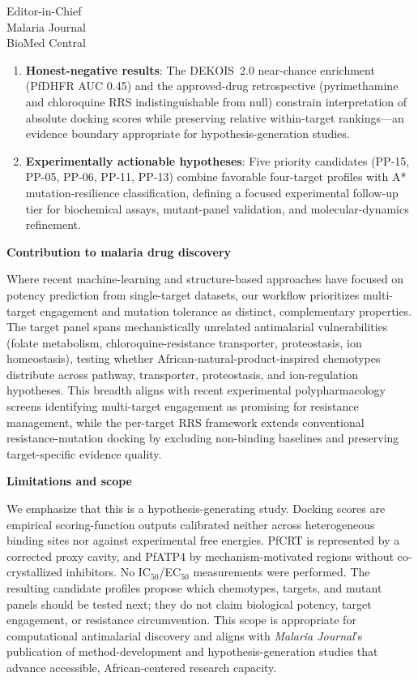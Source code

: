 \documentclass[11pt,a4paper]{letter}
\begin{document}
\begin{letter}{Editor-in-Chief\\
Malaria Journal\\
BioMed Central}
\begin{enumerate}
\item \textbf{Honest-negative results}: The DEKOIS~2.0 near-chance enrichment (PfDHFR AUC 0.45) and the approved-drug retrospective (pyrimethamine and chloroquine RRS indistinguishable from null) constrain interpretation of absolute docking scores while preserving relative within-target rankings—an evidence boundary appropriate for hypothesis-generation studies.

\item \textbf{Experimentally actionable hypotheses}: Five priority candidates (PP-15, PP-05, PP-06, PP-11, PP-13) combine favorable four-target profiles with A* mutation-resilience classification, defining a focused experimental follow-up tier for biochemical assays, mutant-panel validation, and molecular-dynamics refinement.
\end{enumerate}

\textbf{Contribution to malaria drug discovery}

Where recent machine-learning and structure-based approaches have focused on potency prediction from single-target datasets, our workflow prioritizes multi-target engagement and mutation tolerance as distinct, complementary properties. The target panel spans mechanistically unrelated antimalarial vulnerabilities (folate metabolism, chloroquine-resistance transporter, proteostasis, ion homeostasis), testing whether African-natural-product-inspired chemotypes distribute across pathway, transporter, proteostasis, and ion-regulation hypotheses. This breadth aligns with recent experimental polypharmacology screens identifying multi-target engagement as promising for resistance management, while the per-target RRS framework extends conventional resistance-mutation docking by excluding non-binding baselines and preserving target-specific evidence quality.

\textbf{Limitations and scope}

We emphasize that this is a hypothesis-generating study. Docking scores are empirical scoring-function outputs calibrated neither across heterogeneous binding sites nor against experimental free energies. PfCRT is represented by a corrected proxy cavity, and PfATP4 by mechanism-motivated regions without co-crystallized inhibitors. No IC$_{50}$/EC$_{50}$ measurements were performed. The resulting candidate profiles propose which chemotypes, targets, and mutant panels should be tested next; they do not claim biological potency, target engagement, or resistance circumvention. This scope is appropriate for computational antimalarial discovery and aligns with \emph{Malaria Journal}'s publication of method-development and hypothesis-generation studies that advance accessible, African-centered research capacity.


\end{letter}
\end{document}
